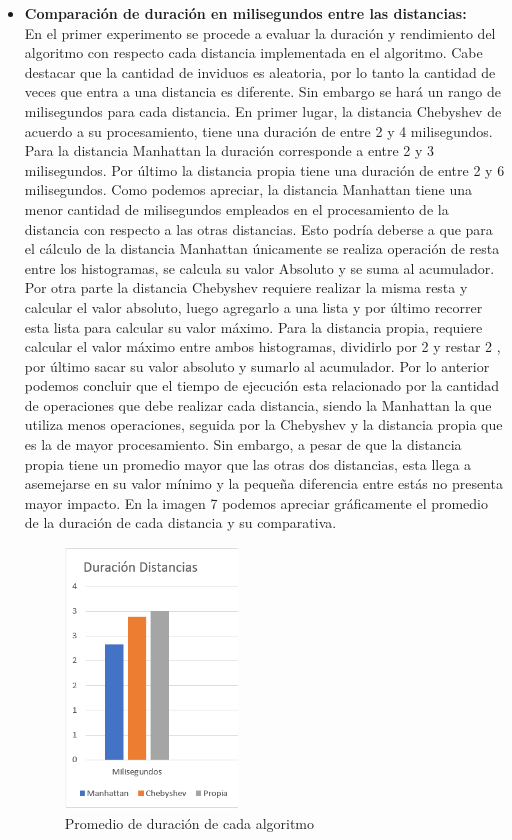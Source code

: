 \documentclass[journal]{IEEEtran}
\begin{document}
\begin{itemize}
	\item{\bf Comparación de duración en milisegundos entre las distancias:}  \\
	En el primer experimento se procede a evaluar la duración y rendimiento del algoritmo con respecto cada distancia implementada en el algoritmo. Cabe destacar que la cantidad de inviduos es aleatoria, por lo tanto la cantidad de veces que entra a una distancia es diferente. Sin embargo se hará un rango de milisegundos para cada distancia. 
	En primer lugar, la distancia Chebyshev de acuerdo a su procesamiento, tiene una duración de entre 2 y 4 milisegundos. Para la distancia Manhattan la duración corresponde a entre 2 y 3 milisegundos. Por último la distancia propia tiene una duración de entre 2 y 6 milisegundos. Como podemos apreciar, la distancia Manhattan tiene una menor cantidad de milisegundos empleados en el procesamiento de la distancia con respecto a las otras distancias. Esto podría deberse a que para el cálculo de la distancia Manhattan únicamente se realiza operación de resta entre los histogramas, se calcula su valor Absoluto y se suma al acumulador. Por otra parte la distancia Chebyshev requiere realizar la misma resta y calcular el valor absoluto, luego agregarlo a una lista y por último recorrer esta lista para calcular su valor máximo. Para la distancia propia, requiere calcular el valor máximo entre ambos histogramas, dividirlo por 2 y restar 2 , por último sacar su valor absoluto y sumarlo al acumulador. Por lo anterior podemos concluir que el tiempo de ejecución esta relacionado por la cantidad de operaciones que debe realizar cada distancia, siendo la Manhattan la que utiliza menos operaciones, seguida por la Chebyshev y la distancia propia que es la de mayor procesamiento. Sin embargo, a pesar de que la distancia propia tiene un promedio mayor que las otras dos distancias, esta llega a asemejarse en su valor mínimo y la pequeña diferencia entre estás no presenta mayor impacto.
	En la imagen 7 podemos apreciar gráficamente el promedio de la duración de cada distancia y su comparativa.
	
	\begin{figure}[h]
		\centering
		\includegraphics[width = 130pt]{comparacion.png}
		\caption{Promedio de duración de cada algoritmo }
	\end{figure}
	

\end{itemize}
\end{document}
